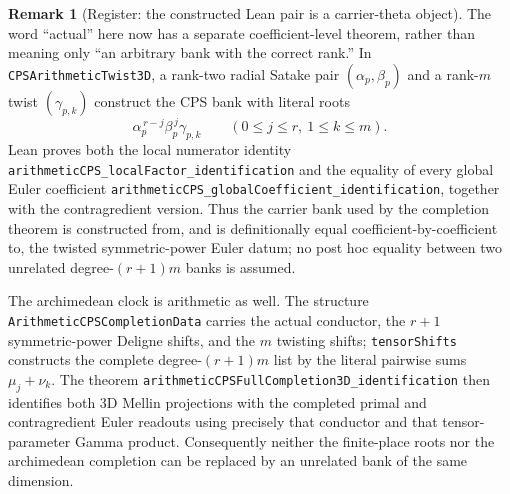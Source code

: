\documentclass[11pt]{article}
\theoremstyle{definition}
\newtheorem{remark}[theorem]{Remark}
\begin{document}
\begin{remark}[Register: the constructed Lean pair is a carrier-theta object]
The word ``actual'' here now has a separate coefficient-level theorem, rather than meaning only
``an arbitrary bank with the correct rank.''  In \texttt{CPSArithmeticTwist3D}, a rank-two radial
Satake pair $(\alpha_p,\beta_p)$ and a rank-$m$ twist $(\gamma_{p,k})$ construct the CPS bank with
literal roots
\[
  \alpha_p^{\,r-j}\beta_p^{\,j}\gamma_{p,k}
  \qquad(0\le j\le r,\ 1\le k\le m).
\]
Lean proves both the local numerator identity
\texttt{arithmeticCPS\_localFactor\_identification} and the equality of every global Euler
coefficient
\texttt{arithmeticCPS\_globalCoefficient\_identification}, together with the contragredient
version.  Thus the carrier bank used by the completion theorem is constructed from, and is
definitionally equal coefficient-by-coefficient to, the twisted symmetric-power Euler datum; no
post hoc equality between two unrelated degree-$(r+1)m$ banks is assumed.

The archimedean clock is arithmetic as well.  The structure
\texttt{ArithmeticCPSCompletionData} carries the actual conductor, the $r+1$ symmetric-power
Deligne shifts, and the $m$ twisting shifts; \texttt{tensorShifts} constructs the complete
degree-$(r+1)m$ list by the literal pairwise sums $\mu_j+\nu_k$.  The theorem
\texttt{arithmeticCPSFullCompletion3D\_identification} then identifies both 3D Mellin projections
with the completed primal and contragredient Euler readouts using precisely that conductor and
that tensor-parameter Gamma product.  Consequently neither the finite-place roots nor the
archimedean completion can be replaced by an unrelated bank of the same dimension.


\end{remark}
\end{document}
